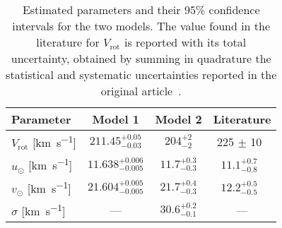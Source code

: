 \begin{table}[H]
    \centering

    \begin{tabular}{l c c | c}
        \hline
        Parameter & Model 1 & Model 2 & Literature\\
        \hline
        $V_{\text{rot}}$ [\unit{\kilo\meter\per\second}] & $211.45_{-0.03}^{+0.05}$ & $204_{-2}^{+2}$ & 225 $\pm$ 10~\cite{GalacticKinematics} \\
        $u_{\odot}$ [\unit{\kilo\meter\per\second}] & $11.638_{-0.005}^{+0.006}$ & $11.7_{-0.3}^{+0.3}$ & $11.1_{-0.8}^{+0.7}$~\cite{LocalKinematics} \\
        $v_{\odot}$ [\unit{\kilo\meter\per\second}] & $21.604_{-0.005}^{+0.005}$ & $21.7_{-0.3}^{+0.4}$ & $12.2^{+0.5}
        _{-0.5}$~\cite{LocalKinematics} \\
        $\sigma$ [\unit{\kilo\meter\per\second}] & --- & $30.6_{-0.1}^{+0.2}$ & --- \\
        \hline
    \end{tabular}
    \caption{Estimated parameters and their 95\% confidence intervals for the two models. The value found in the literature for $V_{\text{rot}}$ is reported with its total uncertainty, obtained by summing in quadrature the statistical and systematic uncertainties reported in the original article~\cite{GalacticKinematics}.}
    \label{tab:parameter_estimates}
\end{table}

